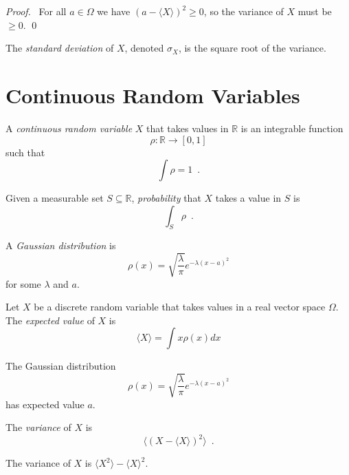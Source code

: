 \begin{proof}
\pf\ For all $a \in \Omega$ we have $(a - \langle X \rangle)^2 \geq 0$, so the variance of $X$ must be $\geq 0$. \qed
\end{proof}

\begin{df}
The \emph{standard deviation} of $X$, denoted $\sigma_X$, is the square root of the variance.
\end{df}

\chapter{Continuous Random Variables}

\begin{df}
A \emph{continuous random variable} $X$ that takes values in $\mathbb{R}$ is an integrable function
\[ \rho : \mathbb{R} \rightarrow [0,1] \]
such that
\[ \int \rho = 1 \enspace . \]

Given a measurable set $S \subseteq \mathbb{R}$, \emph{probability} that $X$ takes a value in $S$ is
\[ \int_S \rho \enspace . \]
\end{df}

\begin{ex}
A \emph{Gaussian distribution} is
\[ \rho(x) = \sqrt{\frac{\lambda}{\pi}} e^{- \lambda (x - a)^2} \]
for some $\lambda$ and $a$.
\end{ex}

\begin{df}
Let $X$ be a discrete random variable that takes values in a real vector space $\Omega$. %
The \emph{expected value} of $X$ is
\[ \langle X \rangle = \int x \rho(x) dx \]
\end{df}

\begin{ex}
The Gaussian distribution
\[ \rho(x) = \sqrt{\frac{\lambda}{\pi}} e^{- \lambda(x-a)^2} \]
has expected value $a$.
\end{ex}

\begin{df}[Variance]
The \emph{variance} of $X$ is
\[ \langle (X - \langle X \rangle)^2 \rangle \enspace . \]
\end{df}

\begin{prop}
The variance of $X$ is $\langle X^2 \rangle - \langle X \rangle^2$.
\end{prop}

